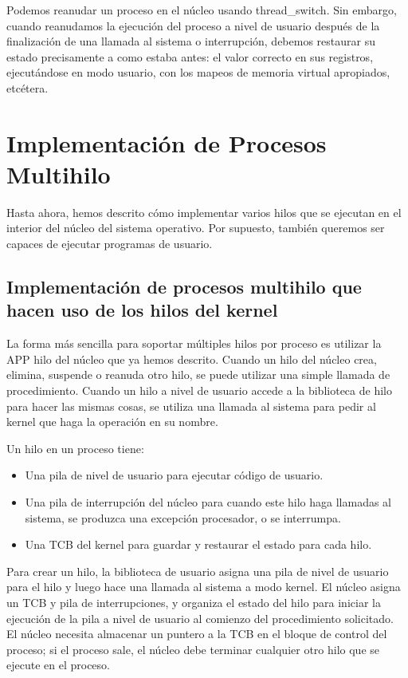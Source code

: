 \documentclass[10pt]{book}
\begin{document}
Podemos reanudar un proceso en el núcleo usando {\mf thread\_switch}. Sin embargo, cuando reanudamos la ejecución del proceso a nivel de usuario después de la finalización de una llamada al sistema o interrupción, debemos restaurar su estado precisamente a como estaba antes: el valor correcto en sus registros, ejecutándose en modo usuario, con los mapeos  de memoria virtual apropiados, etcétera.

\section{Implementación de Procesos Multihilo}
Hasta ahora, hemos descrito cómo implementar varios hilos que se ejecutan en el interior del núcleo del sistema operativo. Por supuesto, también queremos ser capaces de ejecutar programas de usuario.

\subsection{Implementación de procesos multihilo que hacen uso de los hilos del kernel}
La forma más sencilla para soportar múltiples hilos por proceso es utilizar la APP hilo del núcleo que ya hemos descrito. Cuando un hilo del núcleo crea, elimina, suspende o reanuda otro hilo, se puede utilizar una simple llamada de procedimiento. Cuando un hilo a nivel de usuario accede a la biblioteca de hilo para hacer las mismas cosas, se utiliza una llamada al sistema para pedir al kernel que haga la operación en su nombre.

Un hilo en un proceso tiene:
\begin{itemize}
\item Una pila de nivel de usuario para ejecutar código de usuario.
\item Una pila de interrupción del núcleo para cuando este hilo haga llamadas al sistema, se produzca una excepción procesador, o se interrumpa.
\item Una TCB del kernel para guardar y restaurar el estado para cada hilo.
\end{itemize}

Para crear un hilo, la biblioteca de usuario asigna una pila de nivel de usuario para el hilo y luego hace una llamada al sistema a modo kernel. El núcleo asigna un TCB y pila de interrupciones, y organiza el estado del hilo para iniciar la ejecución de la pila a nivel de usuario al comienzo del procedimiento solicitado. El núcleo necesita almacenar un puntero a la TCB en el bloque de control del proceso; si el proceso sale, el núcleo debe terminar cualquier otro hilo que se ejecute en el proceso.
\end{document}
